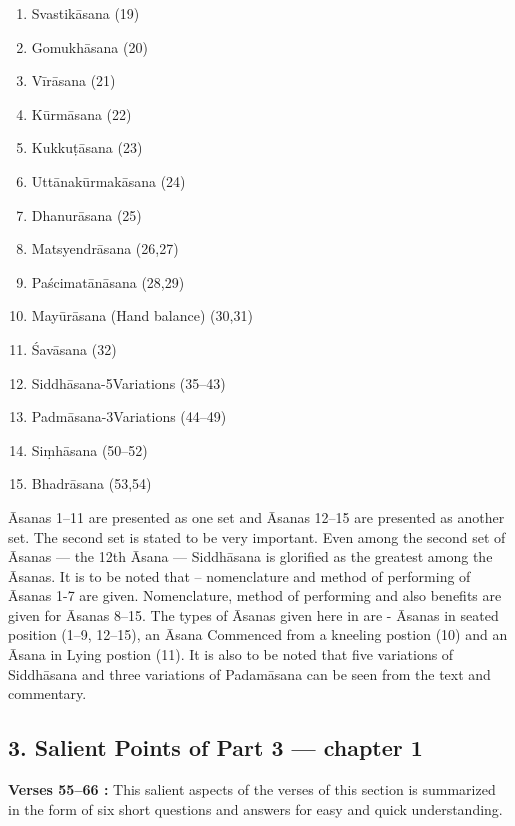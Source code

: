 \begin{multicols}{2}
\begin{enumerate}
\itemsep=0pt
\item Svastikāsana (19)
\item Gomukhāsana (20)
\item Vīrāsana  (21)
\item Kūrmāsana (22)
\item Kukkuṭāsana (23)                                        
\item Uttānakūrmakāsana (24)
\item Dhanurāsana (25)
\item Matsyendrāsana (26,27) 
\item Paścimatānāsana (28,29)
\item Mayūrāsana (Hand balance) (30,31) 
\item Śavāsana (32)  	 		
\item Siddhāsana-5\hfil\break Variations  (35--43) 
\item Padmāsana-3\hfil\break Variations (44--49)
\item Siṃhāsana (50--52)   
\item Bhadrāsana  (53,54)
\end{enumerate}
\end{multicols}

Āsanas 1--11 are presented as one set and Āsanas 12--15 are presented as another set. The second set is stated to be very important. Even among the second set of Āsanas --- the 12th Āsana --- Siddhāsana is glorified as the greatest among the Āsanas. It is to be noted that – nomenclature and method of performing of Āsanas 1-7 are given. Nomenclature, method of performing and also benefits are given for Āsanas 8--15.  The types of Āsanas given here in are  - Āsanas in seated position (1--9, 12--15), an Āsana  Commenced from a kneeling postion (10) and an Āsana in Lying postion (11). It is also to be noted that five variations of Siddhāsana and three variations of Padamāsana can be seen from the text and commentary.

\subsection*{3. Salient Points  of Part 3  --- chapter 1}

\textbf{Verses 55--66 :} This salient aspects of the verses of this section is summarized in the form of six short questions and answers for easy and quick understanding.

